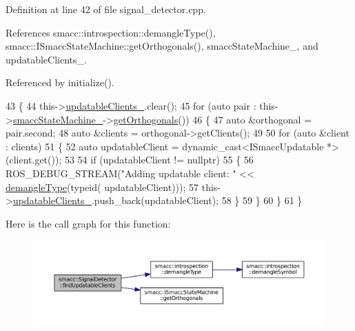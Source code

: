 Definition at line 42 of file signal\+\_\+detector.\+cpp.



References smacc\+::introspection\+::demangle\+Type(), smacc\+::\+I\+Smacc\+State\+Machine\+::get\+Orthogonals(), smacc\+State\+Machine\+\_\+, and updatable\+Clients\+\_\+.



Referenced by initialize().


\begin{DoxyCode}
43 \{
44     this->\hyperlink{classsmacc_1_1SignalDetector_a01a457b4ec935473d6426efb7b87e683}{updatableClients\_}.clear();
45     \textcolor{keywordflow}{for} (\textcolor{keyword}{auto} pair : this->\hyperlink{classsmacc_1_1SignalDetector_a46025de6ac7b5980e22144f9703236a4}{smaccStateMachine\_}->\hyperlink{classsmacc_1_1ISmaccStateMachine_ad6e8b109676edd2df8edf99889508bf4}{getOrthogonals}())
46     \{
47         \textcolor{keyword}{auto} &orthogonal = pair.second;
48         \textcolor{keyword}{auto} &clients = orthogonal->getClients();
49 
50         \textcolor{keywordflow}{for} (\textcolor{keyword}{auto} &client : clients)
51         \{
52             \textcolor{keyword}{auto} updatableClient = \textcolor{keyword}{dynamic\_cast<}ISmaccUpdatable *\textcolor{keyword}{>}(client.get());
53 
54             \textcolor{keywordflow}{if} (updatableClient != \textcolor{keyword}{nullptr})
55             \{
56                 ROS\_DEBUG\_STREAM(\textcolor{stringliteral}{"Adding updatable client: "} << \hyperlink{namespacesmacc_1_1introspection_a670e39ccea29952859df4e2d0e45077b}{demangleType}(\textcolor{keyword}{typeid}(
      updatableClient)));
57                 this->\hyperlink{classsmacc_1_1SignalDetector_a01a457b4ec935473d6426efb7b87e683}{updatableClients\_}.push\_back(updatableClient);
58             \}
59         \}
60     \}
61 \}
\end{DoxyCode}


Here is the call graph for this function\+:
\nopagebreak
\begin{figure}[H]
\begin{center}
\leavevmode
\includegraphics[width=350pt]{classsmacc_1_1SignalDetector_a47ec2df560e2e33758ce3975bece9385_cgraph}
\end{center}
\end{figure}





